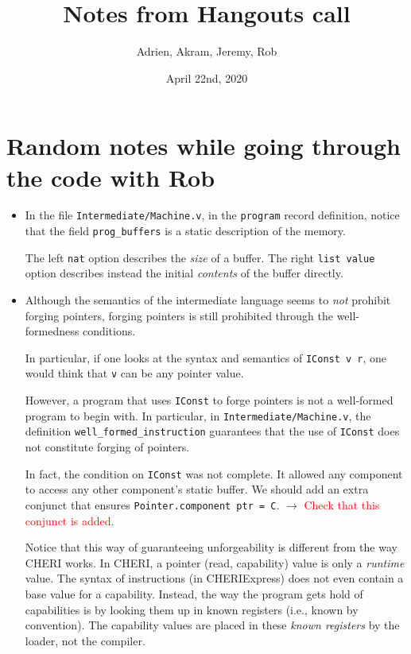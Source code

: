 \documentclass[12pt,a4paper]{article}
\title{Notes from Hangouts call}
\author{Adrien, Akram, Jeremy, Rob}
\date{April 22nd, 2020}
\newcommand{\todo}[1]{$\rightarrow$ \textcolor{red}{#1}}
\begin{document}
\maketitle
\tableofcontents

\section{Random notes while going through the code with Rob}

\begin{itemize}
\item In the file \texttt{Intermediate/Machine.v}, in the
 \texttt{program} record definition, notice that the field 
 \texttt{prog\_buffers} is a static description of the memory.
 
The left \texttt{nat} option describes the \textit{size} of a buffer.
The right \texttt{list value} option describes instead the
initial \textit{contents}
of the buffer directly.

\item Although the 
semantics of the intermediate language seems to \textit{not} prohibit
forging pointers, forging pointers is still prohibited through
the well-formedness conditions.

In particular, if one looks at the syntax and semantics of
\texttt{IConst v r}, one would think that \texttt{v} can be any
pointer value.

However, a program that uses \texttt{IConst} to forge
pointers is not
a well-formed program to begin with. In particular, in 
\texttt{Intermediate/Machine.v}, the definition
\texttt{well\_formed\_instruction} guarantees that 
the use of \texttt{IConst} does not constitute forging of pointers.

In fact, the condition on \texttt{IConst} was not complete. It allowed
any component to access any other component's static buffer.
We should add an extra conjunct that ensures 
\texttt{Pointer.component ptr = C}. 
\todo{Check that this conjunct is added.}

Notice that this way of guaranteeing unforgeability is different
from the way CHERI works.
In CHERI, a pointer (read, capability) value is only a 
\textit{runtime} value. The syntax of instructions (in CHERIExpress)
does not even contain a base value for a capability.
Instead, the way the program gets hold of capabilities is by looking them
up in known registers (i.e., known by convention).
The capability values are placed in these \textit{known registers}
by the loader, not the compiler.


\end{itemize}
\end{document}
